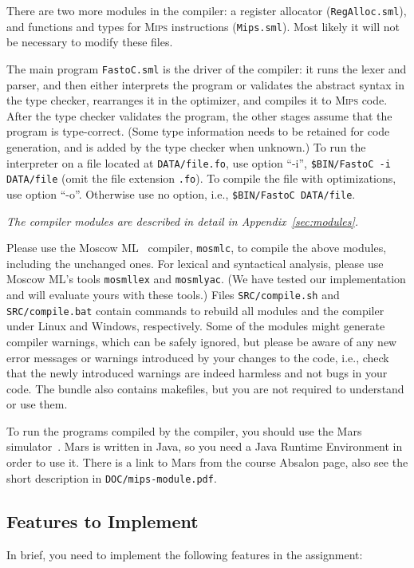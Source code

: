 \documentclass[a4paper,11pt]{article}
\newcommand{\mips}{\textsc{Mips}\xspace}
\newcommand{\mars}{Mars\xspace}
\begin{document}
\noindent
There are two more modules in the compiler: a register allocator
(\texttt{RegAlloc.sml}), and functions and types for \mips instructions
(\texttt{Mips.sml}).  Most likely it will not be necessary to modify these
files.

The main program {\tt FastoC.sml} is the driver of the compiler: it runs the 
lexer and parser, and then either interprets the program or
validates the abstract syntax in the type checker, rearranges it in 
the optimizer, and compiles it to \mips
code. After the type checker validates the program, the other stages assume
that the program is type-correct. (Some type information needs to be retained
for code generation, and is added by the type checker when unknown.)
To run the interpreter on a file located at \texttt{DATA/file.fo}, use option ``-i'', 
{\tt\$BIN/FastoC -i DATA/file} (omit the file extension {\tt .fo}). To compile the
file with optimizations, use option ``-o''. Otherwise use no option,
i.e.,   {\tt\$BIN/FastoC DATA/file}.

{\em The compiler modules are described in detail in Appendix~\ref{sec:modules}.}

Please use the Moscow ML~\cite{MoscowML} compiler, {\tt mosmlc}, to compile the 
above modules, including the unchanged ones. For lexical and syntactical
analysis, please use Moscow ML's tools {\tt mosmllex} and {\tt mosmlyac}.
(We have tested our implementation and will evaluate yours with these tools.)
%
Files {\tt SRC/compile.sh} and {\tt SRC/compile.bat} contain commands
to rebuild all modules and the compiler under Linux and Windows, respectively.
Some of the modules might generate compiler warnings, which can be
safely ignored, but please be aware of any new error messages or warnings introduced
by your changes to the code, i.e., check that the newly introduced warnings are indeed 
harmless and not bugs in your code.
The bundle also contains makefiles, but you are not required to understand or 
use them.

To run the programs compiled by the compiler, you should use the \mars
simulator~\cite{Mars}. \mars is written in Java, so you need a Java Runtime
Environment in order to use it. There is a link to \mars from the course
Absalon page, also see the short description in \texttt{DOC/mips-module.pdf}.

\subsection{Features to Implement}
In brief, you need to implement the 
following features in the assignment:
\end{document}
